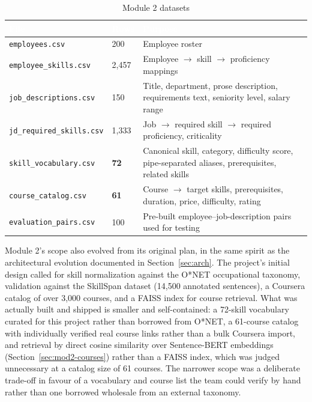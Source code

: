 \documentclass[11pt,a4paper]{article}
\newcommand{\hdrow}{\rowcolor{TPnavy}}
\newcommand{\hdtxt}[1]{\textcolor{white}{\bfseries #1}}
\newcommand{\code}[1]{\texttt{\footnotesize #1}}
\begin{document}
\begin{table}[H]
\centering
\caption{Module 2 datasets}
\label{tab:mod2-data}
\small
\begin{tabular}{p{3.4cm}p{1.6cm}p{9.6cm}}
\toprule
\hdrow \hdtxt{File} & \hdtxt{Rows} & \hdtxt{Purpose} \\
\midrule
\code{employees.csv} & 200 & Employee roster \\
\rowcolor{TPlight}
\code{employee\_skills.csv} & 2{,}457 & Employee $\to$ skill $\to$ proficiency mappings \\
\code{job\_descriptions.csv} & 150 & Title, department, prose description, requirements text, seniority level, salary range \\
\rowcolor{TPlight}
\code{jd\_required\_skills.csv} & 1{,}333 & Job $\to$ required skill $\to$ required proficiency, criticality \\
\code{skill\_vocabulary.csv} & \textbf{72} & Canonical skill, category, difficulty score, pipe-separated aliases, prerequisites, related skills \\
\rowcolor{TPlight}
\code{course\_catalog.csv} & \textbf{61} & Course $\to$ target skills, prerequisites, duration, price, difficulty, rating \\
\code{evaluation\_pairs.csv} & 100 & Pre-built employee--job-description pairs used for testing \\
\bottomrule
\end{tabular}
\end{table}

Module 2's scope also evolved from its original plan, in the same spirit as the architectural evolution documented in Section~\ref{sec:arch}. The project's initial design called for skill normalization against the O*NET occupational taxonomy, validation against the SkillSpan dataset (14,500 annotated sentences), a Coursera catalog of over 3,000 courses, and a FAISS index for course retrieval. What was actually built and shipped is smaller and self-contained: a 72-skill vocabulary curated for this project rather than borrowed from O*NET, a 61-course catalog with individually verified real course links rather than a bulk Coursera import, and retrieval by direct cosine similarity over Sentence-BERT embeddings (Section~\ref{sec:mod2-courses}) rather than a FAISS index, which was judged unnecessary at a catalog size of 61 courses. The narrower scope was a deliberate trade-off in favour of a vocabulary and course list the team could verify by hand rather than one borrowed wholesale from an external taxonomy.
\end{document}
